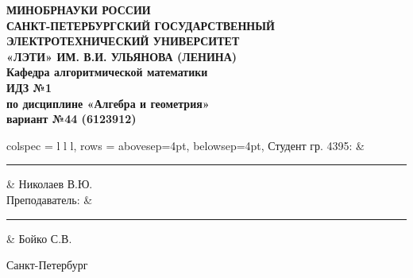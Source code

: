 \begin{titlepage}
	\large
	\begin{center}
		\textbf{МИНОБРНАУКИ РОССИИ}\\
		\textbf{САНКТ-ПЕТЕРБУРГСКИЙ ГОСУДАРСТВЕННЫЙ}\\
		\textbf{ЭЛЕКТРОТЕХНИЧЕСКИЙ УНИВЕРСИТЕТ}\\
		\textbf{«ЛЭТИ» ИМ. В.И. УЛЬЯНОВА (ЛЕНИНА)}\\
		\textbf{Кафедра алгоритмической математики}\\[4cm]

		\textbf{ИДЗ №1}\\
		\textbf{по дисциплине «Алгебра и геометрия»}\\
		\textbf{вариант №44 (6123912)}\\[8cm]
	\end{center}


	\begin{tblr}{
			colspec = {l l l},
			rows = {abovesep=4pt, belowsep=4pt},
		}
		Студент гр. 4395: & \hspace{1cm}\rule{5cm}{0.4pt} & Николаев В.Ю. \\
		Преподаватель:    & \hspace{1cm}\rule{5cm}{0.4pt} & Бойко С.В.    \\
	\end{tblr}

	\vfill
	\begin{center}
		Санкт-Петербург\\
		\the\year
	\end{center}
\end{titlepage}